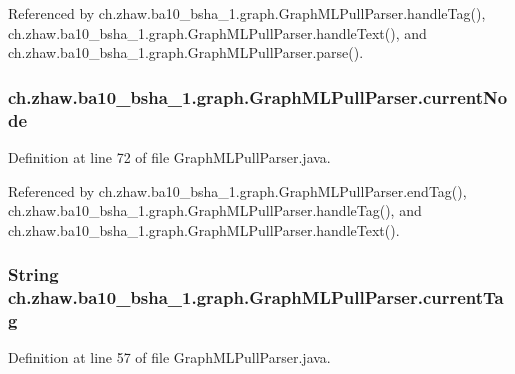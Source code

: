 Referenced by ch.zhaw.ba10\_\-bsha\_\-1.graph.GraphMLPullParser.handleTag(), ch.zhaw.ba10\_\-bsha\_\-1.graph.GraphMLPullParser.handleText(), and ch.zhaw.ba10\_\-bsha\_\-1.graph.GraphMLPullParser.parse().\hypertarget{classch_1_1zhaw_1_1ba10__bsha__1_1_1graph_1_1GraphMLPullParser_a2281dbf08b291997a372d130efea7d07}{
\subsubsection[{currentNode}]{ {\bf ch.zhaw.ba10\_\-bsha\_\-1.graph.GraphMLPullParser.currentNode}}}
\label{classch_1_1zhaw_1_1ba10__bsha__1_1_1graph_1_1GraphMLPullParser_a2281dbf08b291997a372d130efea7d07}


Definition at line 72 of file GraphMLPullParser.java.

Referenced by ch.zhaw.ba10\_\-bsha\_\-1.graph.GraphMLPullParser.endTag(), ch.zhaw.ba10\_\-bsha\_\-1.graph.GraphMLPullParser.handleTag(), and ch.zhaw.ba10\_\-bsha\_\-1.graph.GraphMLPullParser.handleText().\hypertarget{classch_1_1zhaw_1_1ba10__bsha__1_1_1graph_1_1GraphMLPullParser_a29497a03af065e9cb3394b2fe8ecc25f}{
\subsubsection[{currentTag}]{\setlength{\rightskip}{0pt plus 5cm}String {\bf ch.zhaw.ba10\_\-bsha\_\-1.graph.GraphMLPullParser.currentTag}}}
\label{classch_1_1zhaw_1_1ba10__bsha__1_1_1graph_1_1GraphMLPullParser_a29497a03af065e9cb3394b2fe8ecc25f}


Definition at line 57 of file GraphMLPullParser.java.

